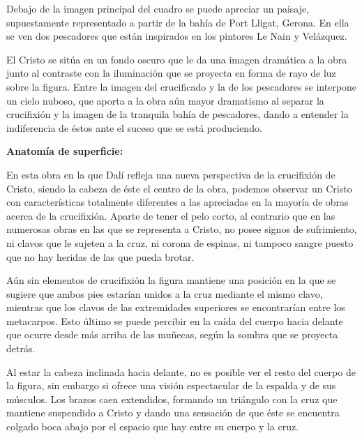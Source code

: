 Debajo de la imagen principal del cuadro se puede apreciar un paisaje, supuestamente representado a partir de la bahía de Port Lligat, Gerona. En ella se ven dos pescadores que están inspirados en los pintores Le Nain y Velázquez\cite{RefWorks:67}. %

El Cristo se sitúa en un fondo oscuro que le da una imagen dramática a la obra junto al contraste con la iluminación que se proyecta en forma de rayo de luz sobre la figura. Entre la imagen del crucificado y la de los pescadores se interpone un cielo nuboso, que aporta a la obra aún mayor dramatismo al separar la crucifixión y la imagen de la tranquila bahía de pescadores, dando a entender la indiferencia de éstos ante el suceso que se está produciendo.


\newpage
\textbf{Anatomía de superficie:}

En esta obra en la que Dalí refleja una nueva perspectiva de la crucifixión de Cristo, siendo la cabeza de éste el centro de la obra, podemos observar un Cristo con características totalmente diferentes a las apreciadas en la mayoría de obras acerca de la crucifixión. Aparte de tener el pelo corto, al contrario que en las numerosas obras en las que se representa a Cristo, no posee signos de sufrimiento, ni clavos que le sujeten a la cruz, ni corona de espinas, ni tampoco sangre puesto que no hay heridas de las que pueda brotar.

Aún sin elementos de crucifixión la figura mantiene una posición en la que se sugiere que ambos pies estarían unidos a la cruz mediante el mismo clavo, mientras que los clavos de las extremidades superiores se encontrarían entre los metacarpos. Esto último se puede percibir en la caída del cuerpo hacia delante que ocurre desde más arriba de las muñecas, según la sombra que se proyecta detrás.

Al estar la cabeza inclinada hacia delante, no es posible ver el resto del cuerpo de la figura, sin embargo si ofrece una visión espectacular de la espalda y de sus músculos. Los brazos caen extendidos, formando un triángulo con la cruz que mantiene suspendido a Cristo y dando una sensación de que éste se encuentra colgado boca abajo por el espacio que hay entre su cuerpo y la cruz.

